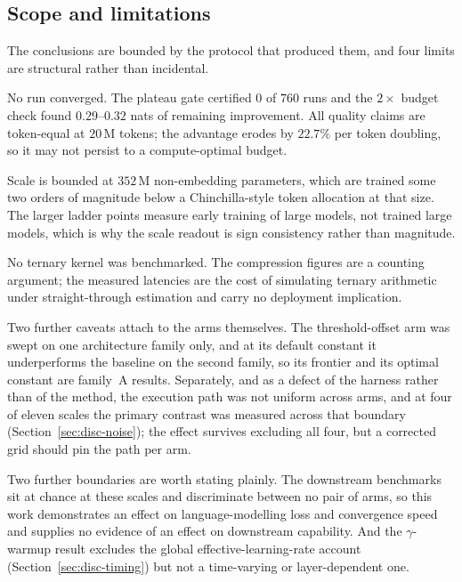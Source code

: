 \documentclass[final,5p,times,twocolumn]{elsarticle}
\theoremstyle{remark}
\begin{document}
\subsection{Scope and limitations}
\label{sec:conc-scope}

The conclusions are bounded by the protocol that produced them, and four
limits are structural rather than incidental.

No run converged. The plateau gate certified $0$ of $760$ runs and the
$2\times$ budget check found $0.29$--$0.32$ nats of remaining improvement. All
quality claims are token-equal at $20$\,M tokens; the advantage erodes by
$22.7\%$ per token doubling, so it may not persist to a compute-optimal budget.

Scale is bounded at $352$\,M non-embedding parameters, which are trained some
two orders of magnitude below a Chinchilla-style token allocation at that
size. The
larger ladder points measure early training of large models, not trained large
models, which is why the scale readout is sign consistency rather than
magnitude.

No ternary kernel was benchmarked. The compression figures are a
counting argument; the measured latencies are the cost of simulating ternary
arithmetic under straight-through estimation and carry no deployment
implication.

Two further caveats attach to the arms themselves. The threshold-offset arm was
swept on one architecture family only, and at its default constant it
underperforms the baseline on the second family, so its frontier and its
optimal constant are family~A results. Separately, and as a defect of the
harness rather than of the method, the execution path was not uniform across
arms, and at four of eleven scales the primary contrast was measured across
that boundary (Section~\ref{sec:disc-noise}); the effect survives excluding
all four, but a corrected grid should pin the path per arm.

Two further boundaries are worth stating plainly. The downstream benchmarks sit
at chance at these scales and discriminate between no pair of arms, so this
work demonstrates an effect on language-modelling loss and convergence speed
and supplies no evidence of an effect on downstream capability. And the
$\gamma$-warmup result excludes the global effective-learning-rate account
(Section~\ref{sec:disc-timing}) but not a time-varying or layer-dependent one.

\end{document}
